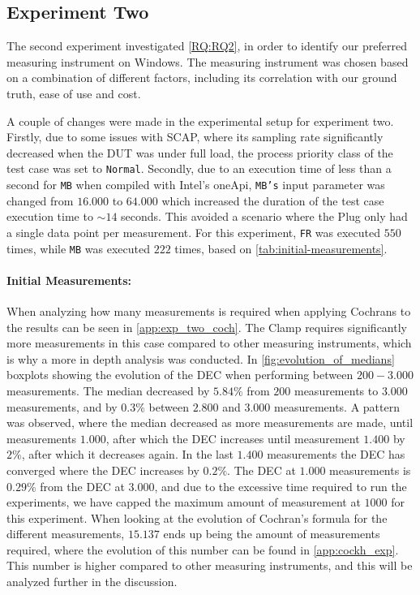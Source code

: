 \subsection{Experiment Two}\label{subsec:exp_two}

The second experiment investigated \cref{RQ:RQ2}, in order to identify our preferred measuring instrument on Windows. The measuring instrument was chosen based on a combination of different factors, including its correlation with our ground truth, ease of use and cost. 

A couple of changes were made in the experimental setup for experiment two. Firstly, due to some issues with SCAP, where its sampling rate significantly decreased when the DUT was under full load, the process priority class of the test case was set to \texttt{Normal}. Secondly, due to an execution time of less than a second for \texttt{MB} when compiled with Intel's oneApi, \texttt{MB's} input parameter was changed from $16.000$ to $64.000$ which increased the duration of the test case execution time to $\sim 14$ seconds. This avoided a scenario where the Plug only had a single data point per measurement. For this experiment, \texttt{FR} was executed $550$ times, while \texttt{MB} was executed $222$ times, based on \cref{tab:initial-measurements}.

\paragraph{Initial Measurements:} When analyzing how many measurements is required when applying Cochrans to the results can be seen in \cref{app:exp_two_coch}. %
The Clamp requires significantly more measurements in this case compared to other measuring instruments, which is why a more in depth analysis was conducted. In \cref{fig:evolution_of_medians} boxplots showing the evolution of the DEC when performing between $200-3.000$ measurements. The median decreased by $5.84\%$ from $200$ measurements to $3.000$ measurements, and by $0.3\%$ between $2.800$ and $3.000$ measurements. A pattern was observed, where the median decreased as more measurements are made, until measurements $1.000$, after which the DEC increases until measurement $1.400$ by $2\%$, after which it decreases again. In the last $1.400$ measurements the DEC has converged where the DEC increases by $0.2\%$. The DEC at $1.000$ measurements is $0.29\%$ from the DEC at $3.000$, and due to the excessive time required to run the experiments, we have capped the maximum amount of measurement at $1000$ for this experiment. When looking at the evolution of Cochran's formula for the different measurements, $15.137$ ends up being the amount of measurements required, where the evolution of this number can be found in \cref{app:cockh_exp}. This number is higher compared to other measuring instruments, and this will be analyzed further in the discussion.

